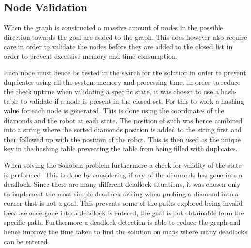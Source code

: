 \subsection{Node Validation}
When the graph is constructed a massive amount of nodes in the possible direction towards the goal are added to the graph.
This does however also require care in order to validate the nodes before they are added to the closed list in order to prevent excessive memory and time consumption.

Each node must hence be tested in the search for the solution in order to prevent duplicates using all the system memory and processing time.
In order to reduce the check uptime when validating a specific state, it was chosen to use a hash-table to validate if a node is present in the closed-set.
For this to work a hashing value for each node is generated.
This is done using the coordinates of the diamonds and the robot at each state.
The position of such was hence combined into a string where the sorted diamonds position is added to the string first and then followed up with the position of the robot.
This is then used as the unique key in the hashing table preventing the table from being filled with duplicates.

When solving the Sokoban problem furthermore a check for validity of the state is performed.
This is done by considering if any of the diamonds has gone into a deadlock.
Since there are many different deadlock situations, it was chosen only to implement the most simple deadlock arising when pushing a diamond into a corner that is not a goal.
This prevents some of the paths explored being invalid because once gone into a deadlock is entered, the goal is not obtainable from the specific path.
Furthermore a deadlock detection is able to reduce the graph and hence improve the time taken to find the solution on maps where many deadlocks can be entered.


